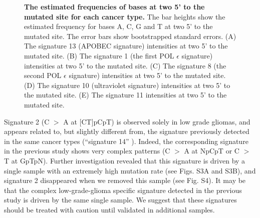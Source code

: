 \documentclass[10pt,letterpaper]{article}
\begin{document}
\begin{figure}[h]
\caption{{\bf The estimated frequencies of bases at two 5' to the mutated site for each cancer type.}
The bar heights show the estimated frequency for bases A, C, G and T at two 5' to the mutated site.
The error bars show bootstrapped standard errors.
(A) The signature 13 (APOBEC signature)  intensities at two 5' to the mutated site.
(B) The signature 1 (the first POL $\epsilon$ signature) intensities at two 5' to the mutated site.
(C) The signature 8 (the second POL $\epsilon$ signature) intensities at two 5' to the mutated site.
(D) The signature 10 (ultraviolet signature) intensities at two 5' to the mutated site.
(E) The signature 11 intensities at two 5' to the mutated site.
}
\label{two5prime}
\end{figure}


Signature 2 (C $>$ A at [CT]pCpT) is observed solely in low grade gliomas, and
appears related to, but slightly different from, the signature previously detected in the same cancer types (``signature 14'' \cite{pmid23318258}). Indeed, the corresponding signature in the previous study shows very complex patterns (C $>$ A at NpCpT or C $>$ T at GpTpN). Further investigation
revealed that this signature is driven by 
a single sample with an extremely high mutation rate (see Figs. S3A and S3B), and signature 2 disappeared when we removed this sample (see Fig. S4).
It may be that the complex low-grade-glioma specific signature detected in the previous study is driven by the same single sample.
We suggest that these signatures should be treated with caution until validated in additional samples. 
 
\end{document}
